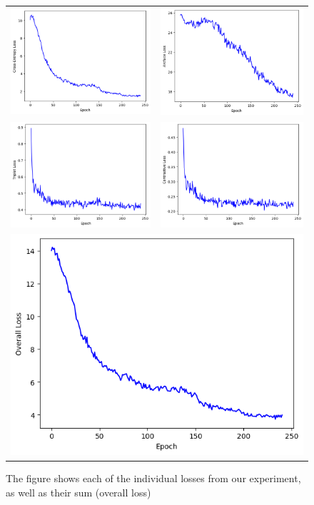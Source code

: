 \documentclass[10pt,twocolumn,letterpaper]{article}
\begin{document}
\newpage
\onecolumn
\begin{figure}[h!]
    \begin{tabular}{cc}
        \includegraphics[width=.5\textwidth]{../loss_imgs/ce.png}&\includegraphics[width=.5\textwidth]{../loss_imgs/arc.png}\\
        \includegraphics[width=.5\textwidth]{../loss_imgs/triplet.png}&\includegraphics[width=.5\textwidth]{../loss_imgs/cont.png}\\
        \multicolumn{2}{c}{\includegraphics[width=.5\textwidth]{../loss_imgs/overall.png}}
    \end{tabular}
    \caption{The figure shows each of the individual losses from our experiment, as well as their sum (overall loss)}    
    \label{fig:loss_graphs}


\end{figure}
\end{document}
